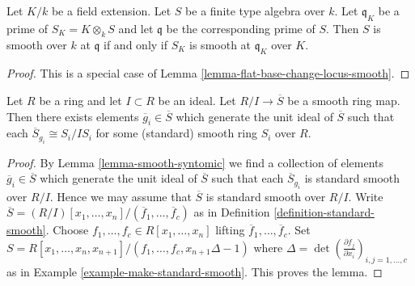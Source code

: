 \begin{lemma}
\label{lemma-smooth-field-change-local}
Let $K/k$ be a field extension.
Let $S$ be a finite type algebra over $k$.
Let $\mathfrak q_K$ be a prime of $S_K = K \otimes_k S$
and let $\mathfrak q$ be the corresponding prime of $S$.
Then $S$ is smooth over $k$ at $\mathfrak q$ if and only if
$S_K$ is smooth at $\mathfrak q_K$ over $K$.
\end{lemma}

\begin{proof}
This is a special case of Lemma \ref{lemma-flat-base-change-locus-smooth}.
\end{proof}

\begin{lemma}
\label{lemma-lift-smooth}
Let $R$ be a ring and let $I \subset R$ be an ideal.
Let $R/I \to \overline{S}$ be a smooth ring map.
Then there exists elements $\overline{g}_i \in \overline{S}$
which generate the unit ideal of $\overline{S}$
such that each $\overline{S}_{g_i} \cong S_i/IS_i$
for some (standard) smooth ring $S_i$ over $R$.
\end{lemma}

\begin{proof}
By Lemma \ref{lemma-smooth-syntomic} we find a collection of elements
$\overline{g}_i \in \overline{S}$
which generate the unit ideal of $\overline{S}$
such that each $\overline{S}_{g_i}$ is standard smooth over $R/I$.
Hence we may assume that $\overline{S}$ is standard smooth
over $R/I$. Write
$\overline{S} =
(R/I)[x_1, \ldots, x_n]/(\overline{f}_1, \ldots, \overline{f}_c)$
as in Definition \ref{definition-standard-smooth}.
Choose $f_1, \ldots, f_c \in R[x_1, \ldots, x_n]$
lifting $\overline{f}_1, \ldots, \overline{f}_c$. Set
$S = R[x_1, \ldots, x_n, x_{n + 1}]/(f_1, \ldots, f_c, x_{n + 1}\Delta - 1)$
where $\Delta = \det(\frac{\partial f_j}{\partial x_i})_{i, j = 1, \ldots, c}$
as in Example \ref{example-make-standard-smooth}.
This proves the lemma.
\end{proof}








